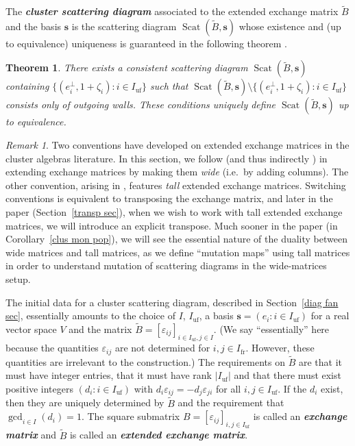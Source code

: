 \documentclass{amsart}
\newtheorem{theorem}[proposition]{Theorem}
\theoremstyle{definition}
\theoremstyle{remark}
\newtheorem{remark}[proposition]{Remark}
\numberwithin{equation}{section}
\newcommand{\newword}[1]{\textbf{\emph{#1}}}
\newcommand{\ep}{\varepsilon}
\newcommand{\uf}{{\operatorname{uf}}}
\newcommand{\fr}{{\operatorname{fr}}}
\newcommand{\set}[1]{{\lbrace #1 \rbrace}}
\newcommand{\0}{{\mathbf{0}}}
\newcommand{\s}{\mathbf{s}}
\newcommand{\tB}{\tilde{B}}
\newcommand{\Scat}{\operatorname{Scat}}
\begin{document}
The \newword{cluster scattering diagram} associated to the extended exchange matrix $\tB$ and the basis $\s$ is the scattering diagram $\Scat(\tB,\s)$ whose existence and (up to equivalence) uniqueness is guaranteed in the following theorem \cite[Theorem~1.12]{GHKK}.

\begin{theorem}\label{key scat}  
There exists a consistent scattering diagram $\Scat(\tB,\s)$ containing $\set{(e_i^\perp,1+\zeta_i):i\in I_\uf}$ such that $\Scat(\tB,\s)\setminus\set{(e_i^\perp,1+\zeta_i):i\in I_\uf}$ consists only of outgoing walls.
These conditions uniquely define $\Scat(\tB,\s)$ up to equivalence.
\end{theorem}

\begin{remark}\label{wide matrices}
Two conventions have developed on extended exchange matrices in the cluster algebras literature.
In this section, we follow \cite{GHKK} (and thus indirectly \cite{FGDilog}) in extending exchange matrices by making them \emph{wide} (i.e.\ by adding columns).
The other convention, arising in \cite{ca4}, features \emph{tall} extended exchange matrices.
Switching conventions is equivalent to transposing the exchange matrix, and later in the paper (Section~\ref{transp sec}), when we wish to work with tall extended exchange matrices, we will introduce an explicit transpose.
Much sooner in the paper (in Corollary~\ref{clus mon pop}), we will see the essential nature of the duality between wide matrices and tall matrices, as we define ``mutation maps'' using tall matrices in order to understand mutation of scattering diagrams in the wide-matrices setup.
\end{remark}

The initial data for a cluster scattering diagram, described in Section~\ref{diag fan sec}, essentially amounts to the choice of $I$, $I_\uf$, a basis $\s=(e_i:i\in I_\uf)$ for a real vector space $V$ and the matrix ${\tB=[\ep_{ij}]_{i\in I_\uf,j\in I}}$.
(We say ``essentially'' here because the quantities $\ep_{ij}$ are not determined for $i,j\in I_\fr$.
However, these quantities are irrelevant to the construction.) 
The requirements on $\tB$ are that it must have integer entries, that it must have rank $|I_\uf|$ and that there must exist positive integers $(d_i:i\in I_\uf)$ with $d_i\ep_{ij}=-d_j\ep_{ji}$ for all $i,j\in I_\uf$.
If the $d_i$ exist, then they are uniquely determined by $\tB$ and the requirement that $\gcd_{i\in I}(d_i)=1$.
The square submatrix ${B=[\ep_{ij}]_{i,j\in I_\uf}}$ is called an \newword{exchange matrix} and $\tB$ is called an \newword{extended exchange matrix}.
\end{document}
